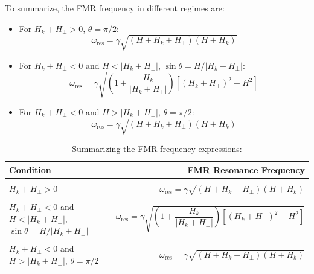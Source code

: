 \documentclass[aps,prb,onecolumn,notitlepage,showpacs,floatfix,superscriptaddress]{revtex4-1}
\newcommand{\mrm}[1]{\mathrm{#1}}
\newcommand{\sint}{\sin\theta}
\begin{document}
To summarize, the FMR frequency in different regimes are:
\begin{itemize}
\item For $H_k+ H_{\perp} > 0$, $\theta = \pi/2$:\\
 $$\omega_\mrm{res}=\gamma \sqrt{\left( H  + H_k  +  H_{\perp} \right) \left( H  + H_k \right) }$$
\item For $H_k+ H_{\perp} < 0$ and $H < \vert H_k+ H_{\perp} \vert $, $\sint = H /\vert H_k+ H_{\perp}\vert$:\\
$$\omega_\mrm{res}=\gamma \sqrt{ \left(1  +  \dfrac{H_k}{\vert H_k+ H_{\perp}\vert} \right)\left[  ( H_k+H_\perp )^2 - H^2 \right]} $$
\item For $H_k+ H_{\perp} < 0$ and $H > \vert H_k+ H_{\perp} \vert $, $\theta = \pi/2$: \\
$$\omega_\mrm{res}=\gamma \sqrt{\left( H  + H_k  +  H_{\perp} \right) \left( H  + H_k \right) }$$
\end{itemize}

\begin{table}[h]
\caption{\label{summary} Summarizing the FMR frequency expressions: }
\begin{ruledtabular}
\begin{tabular}{lr}
Condition & FMR Resonance Frequency \\
\hline
\\
$H_k+ H_{\perp} > 0$	  & $\omega_\mrm{res}=\gamma \sqrt{\left( H  + H_k  +  H_{\perp} \right) \left( H  + H_k \right) }$ \\
\\
$H_k+ H_{\perp} < 0$ and $H < \vert H_k+ H_{\perp} \vert $, $\sint = H /\vert H_k+ H_{\perp}\vert$ & $\omega_\mrm{res}=\gamma \sqrt{ \left(1  +  \dfrac{H_k}{\vert H_k+ H_{\perp}\vert} \right)\left[  ( H_k+H_\perp )^2 - H^2 \right]} $\\
\\
$H_k+ H_{\perp} < 0$ and $H > \vert H_k+ H_{\perp} \vert $, $\theta = \pi/2$ & $\omega_\mrm{res}=\gamma \sqrt{\left( H  + H_k  +  H_{\perp} \right) \left( H  + H_k \right) }$ \\
\end{tabular}
\end{ruledtabular}
\end{table}
\end{document}
